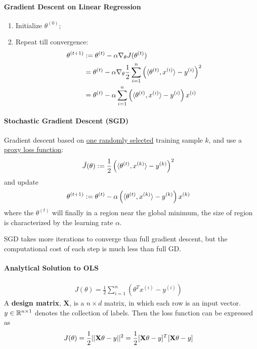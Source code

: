 \documentclass{report}
\begin{document}
        \paragraph{Gradient Descent on Linear Regression}
        \begin{enumerate}
            \item Initialize $\theta^{(0)}$;
            \item Repeat till convergence:
            \begin{align}
                \theta^{(t+1)} &:= \theta^{(t)} - \alpha \nabla_\theta J(\theta^{(t)}) \\
                &= \theta^{(t)} - \alpha \nabla_\theta \frac{1}{2} \sum_{i=1}^n \left( \langle {\theta^{(t)}}, {x^{(i)}} \rangle - y^{(i)} \right )^2 \\
                &= \theta^{(t)} - \alpha \sum_{i=1}^n \left( \langle {\theta^{(t)}}, {x^{(i)}} \rangle - y^{(i)} \right ) x^{(i)}
            \end{align}
        \end{enumerate}
        
        \paragraph{Stochastic Gradient Descent (SGD)} Gradient descent based on \ul{one randomly selected} training sample $k$, and use a \ul{proxy loss function}:
        \begin{align}
            \tilde{J}(\theta) := \frac{1}{2} \left( \langle {\theta^{(t)}}, {x^{(k)}} \rangle - y^{(k)} \right )^2
        \end{align}
        and update
        \begin{align}
            \theta^{(t+1)} := \theta^{(t)} - \alpha \left( \langle {\theta^{(t)}}, {x^{(k)}} \rangle - y^{(k)} \right ) x^{(k)}
        \end{align}
        where the $\theta^{(t)}$ will finally in a region near the global minimum, the size of region is characterized by the learning rate $\alpha$.
        \begin{remark}
            SGD takes more iterations to converge than full gradient descent, but the computational cost of each step is much less than full GD.
        \end{remark}
        \paragraph{Analytical Solution to OLS}
        \begin{align}
            J(\theta) = \frac{1}{2} \sum_{i=1}^n \left(\theta^T x^{(i)} - y^{(i)}\right)
        \end{align}
        A \textbf{design matrix}, $\textbf{X}$, is a $n \times d$ matrix, in which each row is an input vector. $y \in \mathbb{R}^{n \times 1}$ denotes the collection of labels. Then the loss function can be expressed as
        \begin{align}
            J(\theta) = \frac{1}{2} \vert \vert {\textbf{X}\theta - y} \vert \vert^2 = \frac{1}{2} [\textbf{X}\theta - y]^T [\textbf{X}\theta - y]
        \end{align}
        
\end{document}
